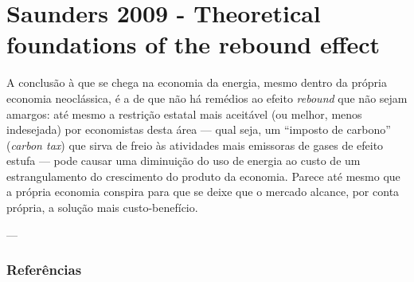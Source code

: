 \section{Saunders 2009 - Theoretical foundations of the rebound effect}
A conclusão à que se chega na economia da energia, mesmo dentro da própria economia neoclássica, é a de que não há remédios ao efeito \textit{rebound} que não sejam amargos: até mesmo a restrição estatal mais aceitável (ou melhor, menos indesejada) por economistas desta área — qual seja, um ``imposto de carbono'' (\textit{carbon tax}) que sirva de freio às atividades mais emissoras de gases de efeito estufa — pode causar uma diminuição do uso de energia ao custo de um estrangulamento do crescimento do produto da economia. Parece até mesmo que a própria economia conspira para que se deixe que o mercado alcance, por conta própria, a solução mais custo-benefício. 

---
\subsubsection{Referências}
